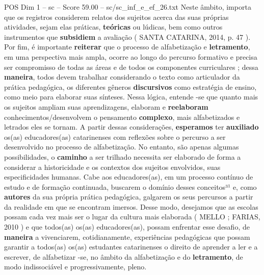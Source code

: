 \begin{textsample}{POS Dim 1 – sc – Score 59.00 – sc/sc\_inf\_e\_ef\_26.txt}
Neste âmbito, importa que os registros considerem relatos dos sujeitos acerca das suas próprias atividades, sejam elas práticas, \textbf{teóricas} ou lúdicas, bem como outros instrumentos que \textbf{subsidiem} a avaliação ( SANTA CATARINA, 2014, p. 47 ).
Por fim, é importante \textbf{reiterar} que o processo de alfabetização e \textbf{letramento}, em uma perspectiva mais ampla, ocorre ao longo do percurso formativo e precisa ser compromisso de todas as áreas e de todos os componentes curriculares ; dessa \textbf{maneira}, todos devem trabalhar considerando o texto como articulador da prática pedagógica, os diferentes gêneros \textbf{discursivos} como estratégia de ensino, como meio para elaborar suas sínteses.
Nessa lógica, entende -se que quanto mais os sujeitos ampliam suas aprendizagens, elaboram e \textbf{reelaboram} conhecimentos/desenvolvem o pensamento \textbf{complexo}, mais alfabetizados e letrados eles se tornam.
A partir dessas considerações, \textbf{esperamos} ter \textbf{auxiliado} os(as) educadores(as) catarinenses com reflexões sobre o percurso a ser desenvolvido no processo de alfabetização.
No entanto, são apenas algumas possibilidades, o \textbf{caminho} a ser trilhado necessita ser elaborado de forma a considerar a historicidade e os contextos dos sujeitos envolvidos, suas especificidades humanas.
Cabe aos educadores(as), em um processo contínuo de estudo e de formação continuada, buscarem o domínio desses conceitos³¹ e, como \textbf{autores} da sua própria prática pedagógica, galgarem os seus percursos a partir da realidade em que se encontram imersos.
Desse modo, desejamos que as escolas possam cada vez mais ser o lugar da cultura mais elaborada ( MELLO ; FARIAS, 2010 ) e que todos(as) os(as) educadores(as), possam enfrentar esse desafio, de \textbf{maneira} a vivenciarem, cotidianamente, experiências pedagógicas que possam garantir a todos(as) os(as) estudantes catarinenses o direito de aprender a ler e a escrever, de alfabetizar -se, no âmbito da alfabetização e do \textbf{letramento}, de modo indissociável e progressivamente, pleno.

\end{textsample}
